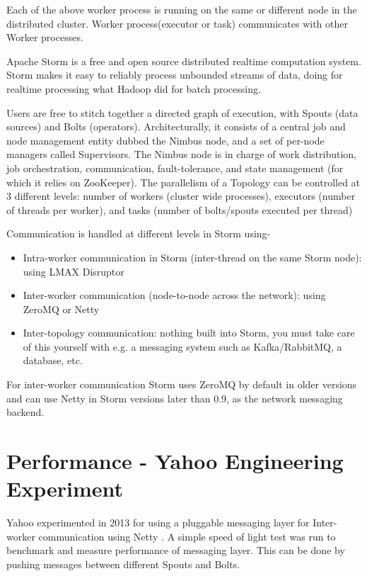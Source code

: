 \documentclass[9pt,twocolumn,twoside]{styles/osajnl}
\begin{document}
Each of the above worker process is running on the same or different
node in the distributed cluster. Worker process(executor or task)
communicates with other Worker processes.

Apache Storm is a free and open source distributed realtime
computation system. Storm makes it easy to reliably process unbounded
streams of data, doing for realtime processing what Hadoop did for
batch processing. \cite{www-storm}

Users are free to stitch together a directed graph of execution, with
Spouts (data sources) and Bolts (operators). Architecturally, it
consists of a central job and node management entity dubbed the Nimbus
node, and a set of per-node managers called Supervisors. The Nimbus
node is in charge of work distribution, job orchestration,
communication, fault-tolerance, and state management (for which it
relies on ZooKeeper). The parallelism of a Topology can be
controlled at 3 different levels: number of workers (cluster wide
processes), executors (number of threads per worker), and tasks
(number of bolts/spouts executed per thread)

Communication is handled at different levels in Storm using-
\begin{itemize}
  \renewcommand{\labelitemi}{\scriptsize$\square$}
        \item Intra-worker communication in Storm (inter-thread on the same Storm node): using LMAX Disruptor
        \item Inter-worker communication (node-to-node across
          the network): using ZeroMQ or Netty
        \item Inter-topology communication: nothing
built into Storm, you must take care of this yourself with e.g. a
messaging system such as Kafka/RabbitMQ, a database, etc.
\end{itemize}

For inter-worker communication Storm uses ZeroMQ by default in older
versions and can use Netty in Storm versions later than 0.9, as the
network messaging backend.

\section{Performance - Yahoo Engineering Experiment}

Yahoo experimented in 2013 for using a pluggable messaging layer for
Inter-worker communication using Netty \cite{article-storm-netty}. A
simple speed of light test was run to benchmark and measure
performance of messaging layer. This can be done by pushing messages
between different Spouts and Bolts.
\end{document}
